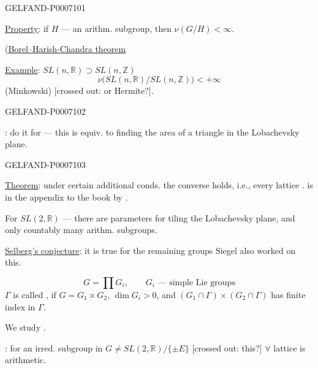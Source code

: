 \begin{GelfandAdjacentEvidence}{GELFAND-P000710}{1}

\underline{\underline{Property}}: if \(H\) --- an arithm. subgroup, then \(\nu(G/H)<\infty\).

(\href{https://www.mathnet.ru/eng/mat302}{Borel–Harish-Chandra theorem}

\underline{Example}: \(SL(n,\mathbb R)\supset SL(n,\mathbb Z)\)
\[
\nu\bigl(SL(n,\mathbb R)/SL(n,\mathbb Z)\bigr)<+\infty
\]
(Minkowski) [crossed out: or Hermite?].
\end{GelfandAdjacentEvidence}
\begin{GelfandAdjacentEvidence}{GELFAND-P000710}{2}


: do it for  --- this is equiv. to finding the area of a triangle in the Lobachevsky plane.
\end{GelfandAdjacentEvidence}
\begin{GelfandAdjacentEvidence}{GELFAND-P000710}{3}


\underline{Theorem}: under certain additional conds. the converse holds, i.e.,
every lattice .
 is in the appendix to the book by .

For \(SL(2,\mathbb R)\)  --- there are parameters for tiling the Lobachevsky plane, and only countably many arithm. subgroups.

\underline{Selberg’s conjecture}: it is true for the remaining groups
Siegel also worked on this.

\[
G=\prod G_i,\qquad G_i\text{ --- simple Lie groups}
\]
 \(\Gamma\) is called , if
\(G=G_1\times G_2\), \(\dim G_i>0\),
and \((G_1\cap\Gamma)\times(G_2\cap\Gamma)\) has finite index in \(\Gamma\).

We study .

: for an irred. subgroup in \(G\ne SL(2,\mathbb R)/\{\pm E\}\)
[crossed out: this?] \(\forall\) lattice is arithmetic.
\end{GelfandAdjacentEvidence}
